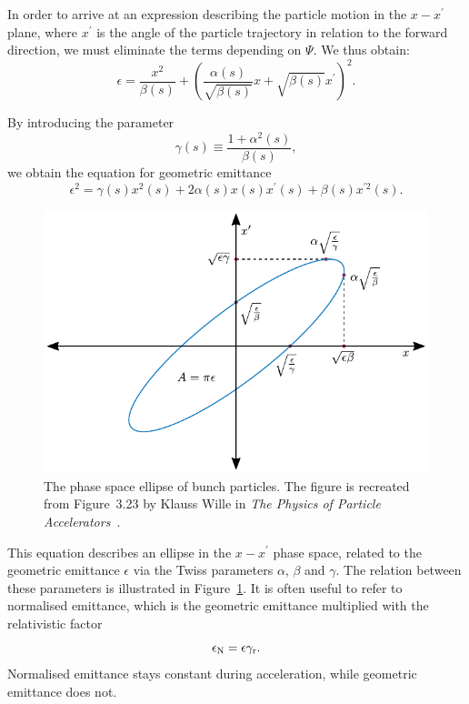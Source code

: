 In order to arrive at an expression describing the particle motion in the $x-x^\prime$ plane, where $x^\prime$ is the angle of the particle trajectory in relation to the forward direction, we must eliminate the terms depending on $\Psi$.
We thus obtain:
\begin{equation}
    \epsilon = \frac{x^2}{\beta(s)} + \left(\frac{\alpha(s)}{\sqrt{\beta(s)}}x + \sqrt{\beta(s)}x^{\prime}\right)^2.
\end{equation}

By introducing the parameter
\begin{equation}
    \gamma(s) \equiv \frac{1+\alpha^2(s)}{\beta(s)}, \label{EQ:TwissGamma}
\end{equation}
we obtain the equation for geometric emittance
\begin{equation}
    \epsilon^2 = \gamma(s)x^2(s) + 2\alpha(s)x(s)x^{\prime}(s) + \beta(s)x^{\prime 2}(s). \label{EQ:EmittFull}
\end{equation}

\begin{figure}[hbt]
    \centering
    \includegraphics[width=0.8\linewidth]{figures/Twiss}
    \caption{\label{Fig:BPI:Twiss}
        The phase space ellipse of bunch particles.
        The figure is recreated from Figure~3.23 by Klauss Wille in \textit{The Physics of Particle Accelerators}~\cite{wille:2001}.
    }
\end{figure}

This equation describes an ellipse in the $x-x^\prime$ phase space, related to the geometric emittance $\epsilon$ via the Twiss parameters $\alpha$, $\beta$ and $\gamma$.
The relation between these parameters is illustrated in Figure~\ref{Fig:BPI:Twiss}.
It is often useful to refer to normalised emittance, which is the geometric emittance multiplied with the relativistic factor
\begin{equation}
    \epsilon_{\mathrm{N}} = \epsilon \gamma_{\mathrm{r}}. \label{EQ:NormEmit}
\end{equation}
Normalised emittance stays constant during acceleration, while geometric emittance does not.

